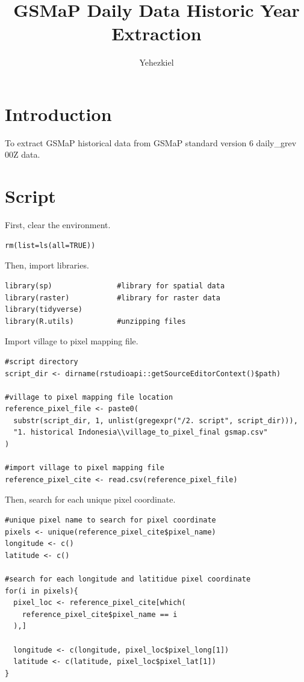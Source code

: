 \documentclass[12pt, a4paper]{article}
\title{\textbf{\huge GSMaP Daily Data Historic Year Extraction}}
\author{\huge Yehezkiel}
\begin{document}
\maketitle
\thispagestyle{empty}


\newpage

\section{Introduction}
To extract GSMaP historical data from GSMaP standard version 6 daily\_grev 00Z data.

\section{Script}
First, clear the environment.

\begin{lstlisting}
rm(list=ls(all=TRUE))
\end{lstlisting}

\vskip 0.5cm
\noindent
Then, import libraries.

\begin{lstlisting}
library(sp)               #library for spatial data
library(raster)           #library for raster data
library(tidyverse)
library(R.utils)          #unzipping files
\end{lstlisting}

\vskip 0.5cm
\noindent
Import village to pixel mapping file.

\begin{lstlisting}
#script directory
script_dir <- dirname(rstudioapi::getSourceEditorContext()$path)

#village to pixel mapping file location
reference_pixel_file <- paste0(
  substr(script_dir, 1, unlist(gregexpr("/2. script", script_dir))),
  "1. historical Indonesia\\village_to_pixel_final gsmap.csv"
)

#import village to pixel mapping file
reference_pixel_cite <- read.csv(reference_pixel_file)
\end{lstlisting}

\vskip 0.5cm
\noindent
Then, search for each unique pixel coordinate.

\begin{lstlisting}
#unique pixel name to search for pixel coordinate
pixels <- unique(reference_pixel_cite$pixel_name)
longitude <- c()
latitude <- c()

#search for each longitude and latitidue pixel coordinate
for(i in pixels){
  pixel_loc <- reference_pixel_cite[which(
    reference_pixel_cite$pixel_name == i
  ),]
  
  longitude <- c(longitude, pixel_loc$pixel_long[1])
  latitude <- c(latitude, pixel_loc$pixel_lat[1])
}
\end{lstlisting}
\end{document}
